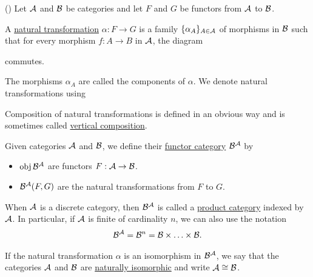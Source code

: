 \begin{definition}\label{def:natural_transformation}(\cite[definition 1.3.1]{Leinster2014})
  Let $\mathcal A$ and $\mathcal B$ be categories and let $F$ and $G$ be functors from $\mathcal A$ to $\mathcal B$.

  A \uline{natural transformation} $\alpha: F \to G$ is a family $\{ \alpha_A \}_{A \in \mathcal A}$ of morphisms in $\mathcal B$ such that for every morphism $f: A \to B$ in $\mathcal A$, the diagram
  \begin{center}
  \end{center}
  commutes.

  The morphisms $\alpha_A$ are called the components of $\alpha$. We denote natural transformations using
  \begin{center}
  \end{center}

  Composition of natural transformations is defined in an obvious way and is sometimes called \uline{vertical composition}.
\end{definition}

\begin{definition}\label{def:functor_category}
  Given categories $\mathcal A$ and $\mathcal B$, we define their \uline{functor category} ${\mathcal B}^{\mathcal A}$ by
  \begin{itemize}
    \item $\operatorname{obj} {\mathcal B}^{\mathcal A}$ are functors $F: \mathcal A \to \mathcal B$.
    \item ${\mathcal B}^{\mathcal A}(F, G)$ are the natural transformations from $F$ to $G$.
  \end{itemize}

  When $\mathcal A$ is a discrete category, then ${\mathcal B}^{\mathcal A}$ is called a \uline{product category} indexed by $\mathcal A$. In particular, if $\mathcal A$ is finite of cardinality $n$, we can also use the notation
  \begin{align*}
    {\mathcal B}^{\mathcal A} = {\mathcal B}^n = \mathcal B \times \ldots \times \mathcal B.
  \end{align*}

  If the natural transformation $\alpha$ is an isomorphism in ${\mathcal B}^{\mathcal A}$, we say that the categories $\mathcal A$ and $\mathcal B$ are \uline{naturally isomorphic} and write $\mathcal A \cong \mathcal B$.
\end{definition}

